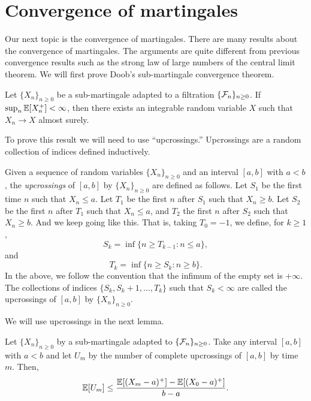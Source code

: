  \section{Convergence of martingales}
 Our next topic is the convergence of martingales. There are many results about the convergence of martingales. The arguments are quite different from previous convergence results such as the strong law of large numbers of the central limit theorem. We will first prove Doob's sub-martingale convergence theorem.
 \begin{theorem}\label{convergence}
     Let $\{X_n\}_{n \ge 0}$ be a sub-martingale adapted to a filtration $\{{\mathcal{F}}_n\}_{n \ge 0}$. If $\sup_n {\mathbb{E}}[X_n^+]<\infty$, then there exists an integrable random variable $X$ such that $X_n \to X$ almost surely.
 \end{theorem}
 To prove this result we will need to use ``upcrossings.'' Upcrossings are a random collection of indices defined inductively. 
 \begin{definition}
     Given a sequence of random variables $\{X_n\}_{n \ge 0}$ and an interval $[a,b]$ with $a<b$, the \emph{upcrossings} of $[a,b]$ by $\{X_n\}_{n \ge 0}$ are defined as follows. Let $S_1$ be the first time $n$ such that $X_n \le a$. Let $T_1$ be the first $n$ after $S_1$ such that $X_n \ge b$. Let $S_2$ be the first $n$ after $T_1$ such that $X_n \le a$, and $T_2$ the first $n$ after $S_2$ such that $X_n \ge b$. And we keep going like this. That is, taking $T_0 = -1$, we define, for $k \ge 1$,
     \[S_k = \inf\{n \ge T_{k-1} : n \le a\}, \]
     and 
     \[T_k  = \inf \{n \ge S_k : n \ge b\}. \]
     In the above, we follow the convention that the infimum of the empty set is $+\infty$. The collections of indices $\{S_k,S_k+1,\ldots,T_k\}$ such that $S_k <\infty$ are called the upcrossings of $[a,b]$ by $\{X_n\}_{n \ge 0}$. 
 \end{definition}
 We will use upcrossings in the next lemma.
 \begin{lemma}
    Let $\{X_n\}_{n \ge 0}$ by a sub-martingale adapted to $\{{\mathcal{F}}_n\}_{n \ge0}$. Take any interval $[a,b]$ with $a<b$ and let $U_m$ by the number of complete upcrossings of $[a,b]$ by time $m$. Then,
    \[{\mathbb{E}}[U_m] \le \frac{{\mathbb{E}}[(X_m-a)^+]-{\mathbb{E}}[(X_0-a)^+]}{b-a}. \]    
 \end{lemma}
